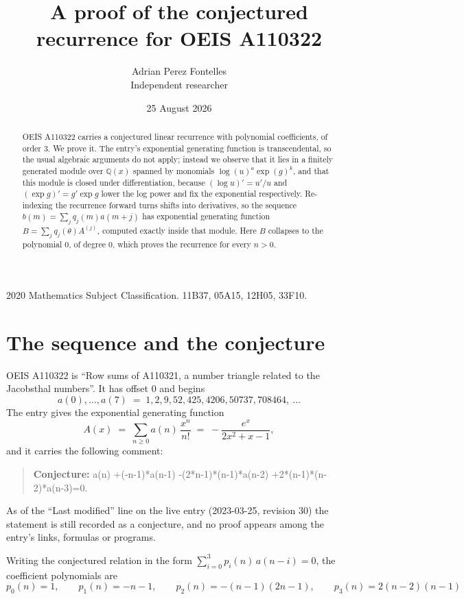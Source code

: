 \documentclass[11pt,a4paper]{article}
\title{A proof of the conjectured recurrence for OEIS A110322}
\author{Adrian Perez Fontelles\\ \small Independent researcher}
\date{25 August 2026}
\theoremstyle{plain}
\theoremstyle{definition}
\begin{document}
\maketitle

\begin{abstract}
OEIS A110322 carries a conjectured linear recurrence with polynomial coefficients, of
order 3. We prove it. The entry's exponential generating function is
transcendental, so the usual algebraic arguments do not apply; instead we observe that it
lies in a finitely generated module over $\mathbb{Q}(x)$ spanned by monomials
$\log(u)^{a}\exp(g)^{k}$, and that this module is closed under differentiation, because
$(\log u)'=u'/u$ and $(\exp g)'=g'\exp g$ lower the log power and fix the exponential
respectively. Re-indexing the recurrence forward turns shifts into derivatives, so the
sequence $b(m)=\sum_{j}q_{j}(m)a(m+j)$ has exponential generating function
$B=\sum_{j}q_{j}(\theta)A^{(j)}$, computed exactly inside that module. Here $B$ collapses
to the polynomial $0$, of degree $0$, which proves the recurrence for every
$n>0$.
\end{abstract}

\noindent\small 2020 Mathematics Subject Classification. 11B37, 05A15, 12H05, 33F10.\normalsize

\section{The sequence and the conjecture}

OEIS A110322 is ``Row sums of A110321, a number triangle related to the Jacobsthal numbers''. It has offset $0$ and begins
\[
a(0),\dots,a(7)\;=\;1, 2, 9, 52, 425, 4206, 50737, 708464,\ \dots
\]
The entry gives the exponential generating function
\begin{equation}\label{eq:gf}
A(x)\;=\;\sum_{n\ge 0} a(n)\,\frac{x^{n}}{n!}\;=\;- \frac{e^{x}}{2 x^{2} + x - 1} ,
\end{equation}
and it carries the following comment:
\begin{quote}\small
\textbf{Conjecture:} a(n) +(-n-1)*a(n-1) -(2*n-1)*(n-1)*a(n-2) +2*(n-1)*(n-2)*a(n-3)=0.
\end{quote}
As of the ``Last modified'' line on the live entry (2023-03-25, revision 30) the
statement is still recorded as a conjecture, and no proof appears among the entry's links,
formulas or programs.

Writing the conjectured relation in the form $\sum_{i=0}^{3}p_{i}(n)\,a(n-i)=0$,
the coefficient polynomials are
\[
p_{0}(n)=1,\qquad p_{1}(n)=- n - 1,\qquad p_{2}(n)=- \left(n - 1\right) \left(2 n - 1\right),\qquad p_{3}(n)=2 \left(n - 2\right) \left(n - 1\right)
\]
\end{document}
